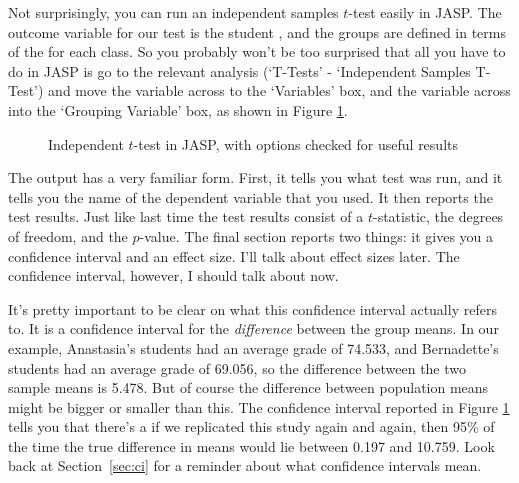 
Not surprisingly, you can run an independent samples $t$-test easily in JASP. The outcome variable for our test is the student , and the groups are defined in terms of the  for each class. So you probably won't be too surprised that all you have to do in JASP is go to the relevant analysis (`T-Tests' - `Independent Samples T-Test') and move the  variable across to the `Variables' box, and the  variable across into the `Grouping Variable' box, as shown in Figure \ref{fig:ttest_ind}.

\begin{figure}[htb]
\begin{center}
\caption{Independent $t$-test in JASP, with options checked for useful results}
\HR
\label{fig:ttest_ind}
\end{center}
\end{figure}

The output has a very familiar form. First, it tells you what test was run, and it tells you the name of the dependent variable that you used. It then reports the test results. Just like last time the test results consist of a $t$-statistic, the degrees of freedom, and the $p$-value. The final section reports two things: it gives you a confidence interval and an effect size. I'll talk about effect sizes later. The confidence interval, however, I should talk about now. 

It's pretty important to be clear on what this confidence interval actually refers to. It is a confidence interval for the {\it difference} between the group means. In our example, Anastasia's students had an average grade of 74.533, and Bernadette's students had an average grade of 69.056, so the difference between the two sample means is 5.478. But of course the difference between population means might be bigger or smaller than this. The confidence interval reported in Figure \ref{fig:ttest_ind} tells you that there's a if we replicated this study again and again, then 95\% of the time the true difference in means would lie between 0.197 and 10.759. Look back at Section~\ref{sec:ci} for a reminder about what confidence intervals mean.  

